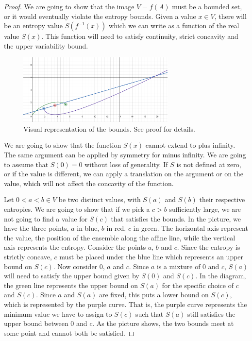 \begin{mathSection}
\begin{proof}
	We are going to show that the image $V=f(A)$ must be a bounded set, or it would eventually violate the entropy bounds. Given a value $x \in V$, there will be an entropy value $S(f^{-1}(x))$ which we can write as a function of the real value $S(x)$. This function will need to satisfy continuity, strict concavity and the upper variability bound.

\begin{figure}[H]
	\centering
	\includegraphics[width=0.7\textwidth]{tempimages/BoundsFromEntropy.png}
	\caption{Visual representation of the bounds. See proof for details.}
\end{figure}
	We are going to show that the function $S(x)$ cannot extend to plus infinity. The same argument can be applied by symmetry for minus infinity. We are going to assume that $S(0) = 0$ without loss of generality. If $S$ is not defined at zero, or if the value is different, we can apply a translation on the argument or on the value, which will not affect the concavity of the function.
	
	Let $0 < a < b \in V$ be two distinct values, with $S(a)$ and $S(b)$ their respective entropies. We are going to show that if we pick a $c > b$ sufficiently large, we are not going to find a value for $S(c)$ that satisfies the bounds. In the picture, we have the three points, $a$ in blue, $b$ in red, $c$ in green. The horizontal axis represent the value, the position of the ensemble along the affine line, while the vertical axis represents the entropy. Consider the points $a$, $b$ and $c$. Since the entropy is strictly concave, $c$ must be placed under the blue line which represents an upper bound on $S(c)$. Now consider $0$, $a$ and $c$. Since $a$ is a mixture of $0$ and $c$, $S(a)$ will need to satisfy the upper bound given by $S(0)$ and $S(c)$. In the diagram, the green line represents the upper bound on $S(a)$ for the specific choice of $c$ and $S(c)$. Since $a$ and $S(a)$ are fixed, this puts a lower bound on $S(c)$, which is represented by the purple curve. That is, the purple curve represents the minimum value we have to assign to $S(c)$ such that $S(a)$ still satisfies the upper bound between $0$ and $c$. As the picture shows, the two bounds meet at some point and cannot both be satisfied.
	

\end{proof}
\end{mathSection}
